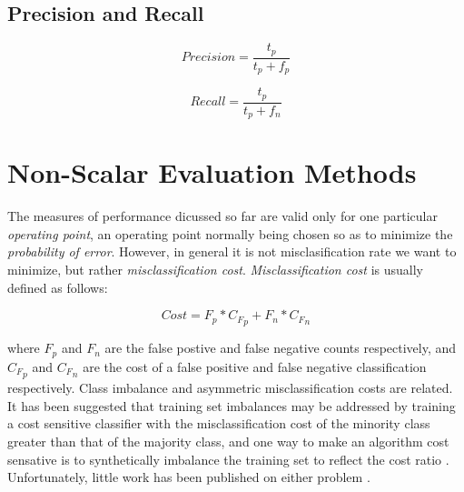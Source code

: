 \documentclass[10pt]{unbthesis}
\begin{document}
\subsection{Precision and Recall}

\begin{equation}
\label{equ:precision}
Precision = \frac{t_p}{t_p + f_p}
\end{equation}


\begin{equation}
\label{equ:recall}
Recall = \frac{t_p}{t_p + f_n}
\end{equation}

\section{Non-Scalar Evaluation Methods}
The measures of performance dicussed so far are valid only for one
particular \textit{operating point}, an operating point normally being
chosen so as to minimize the \textit{probability of error}. However,
in general it is not misclasification rate we want to minimize, but
rather \textit{misclassification cost}. \textit{Misclassification
  cost} is usually defined as follows:

\begin{equation}
\label{equ:misclasscost}
Cost = F_p * {C_F}_p + F_n * {C_F}_n
\end{equation}

where \(F_p\) and \(F_n\) are the false postive and false negative
counts respectively, and \({C_F}_p\) and \({C_F}_n\) are the cost of a
false positive and false negative classification respectively. Class
imbalance and asymmetric misclassification costs are related. It has
been suggested that training
set imbalances may be addressed by training a cost sensitive classifier
with the misclassification cost of the minority class greater than
that of the majority class, and one way to make an algorithm cost
sensative is to synthetically imbalance the training set to reflect
the cost ratio \cite{RefWorks:52}. Unfortunately, little work has been
published on either problem \cite{RefWorks:61}.
\end{document}
